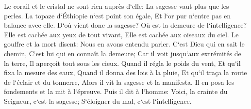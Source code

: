 \verse Le corail et le cristal ne sont rien auprès d`elle: La sagesse vaut plus que les perles. 
\verse La topaze d`Éthiopie n`est point son égale, Et l`or pur n`entre pas en balance avec elle. 
\verse D`où vient donc la sagesse? Où est la demeure de l`intelligence? 
\verse Elle est cachée aux yeux de tout vivant, Elle est cachée aux oiseaux du ciel. 
\verse Le gouffre et la mort disent: Nous en avons entendu parler. 
\verse C`est Dieu qui en sait le chemin, C`est lui qui en connaît la demeure; 
\verse Car il voit jusqu`aux extrémités de la terre, Il aperçoit tout sous les cieux. 
\verse Quand il régla le poids du vent, Et qu`il fixa la mesure des eaux, 
\verse Quand il donna des lois à la pluie, Et qu`il traça la route de l`éclair et du tonnerre, 
\verse Alors il vit la sagesse et la manifesta, Il en posa les fondements et la mit à l`épreuve. 
\verse Puis il dit à l`homme: Voici, la crainte du Seigneur, c`est la sagesse; S`éloigner du mal, c`est l`intelligence. 


